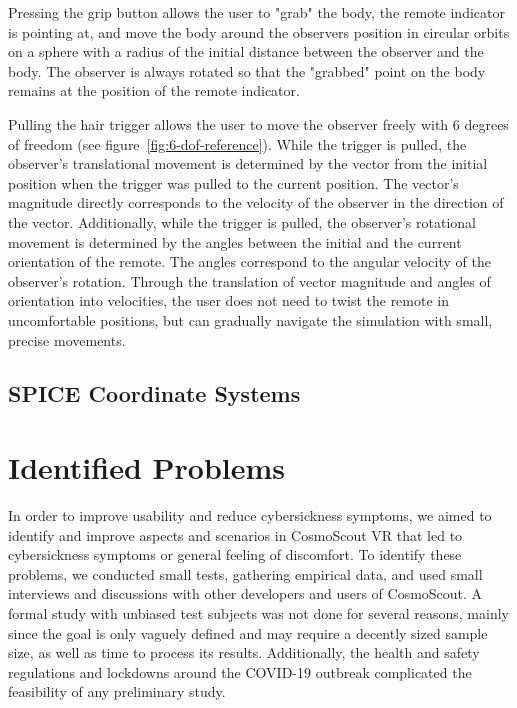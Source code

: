Pressing the grip button allows the user to "grab" the body, the remote indicator is pointing at, and move the body
around the observers position in circular orbits on a sphere with a radius of the initial distance between the
observer and the body.
The observer is always rotated so that the "grabbed" point on the body remains at the position of the remote indicator.

Pulling the hair trigger allows the user to move the observer freely with 6 degrees of freedom (see
figure~\ref{fig:6-dof-reference}).
While the trigger is pulled, the observer's translational movement is determined by the vector from the initial
position when the trigger was pulled to the current position.
The vector's magnitude directly corresponds to the velocity of the observer in the direction of the vector.
Additionally, while the trigger is pulled, the observer's rotational movement is determined by the angles between the
initial and the current orientation of the remote.
The angles correspond to the angular velocity of the observer's rotation.
Through the translation of vector magnitude and angles of orientation into velocities, the user does not need to
twist the remote in uncomfortable positions, but can gradually navigate the simulation with small, precise movements.

\subsection{SPICE Coordinate Systems}\label{subsec:spice-coordinate-systems}


\section{Identified Problems}\label{sec:identified-problems}

In order to improve usability and reduce cybersickness symptoms, we aimed to identify and improve aspects and
scenarios in CosmoScout VR that led to cybersickness symptoms or general feeling of discomfort.
To identify these problems, we conducted small tests, gathering empirical data, and used small interviews and
discussions with other developers and users of CosmoScout.
A formal study with unbiased test subjects was not done for several reasons, mainly since the goal is only vaguely
defined and may require a decently sized sample size, as well as time to process its results.
Additionally, the health and safety regulations and lockdowns around the COVID-19 outbreak complicated the feasibility
of any preliminary study.

